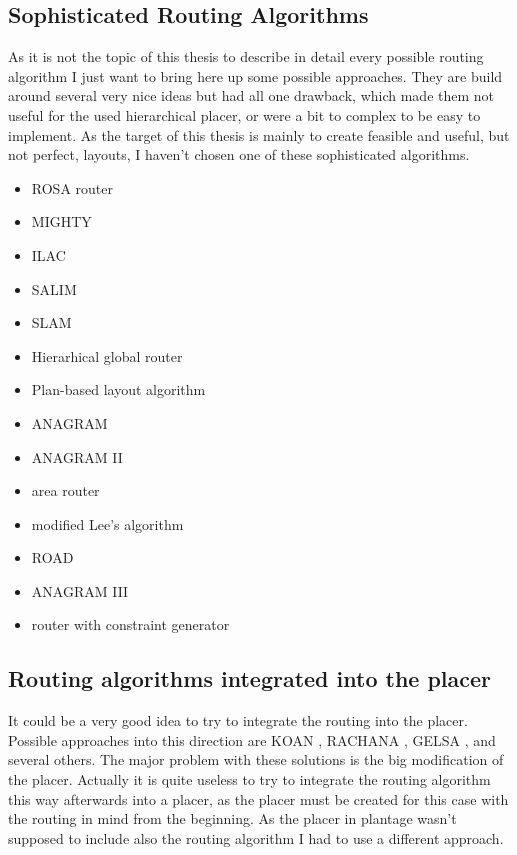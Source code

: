 \subsection{Sophisticated Routing Algorithms}
As it is not the topic of this thesis to describe in detail every possible routing algorithm I just want to bring here up some possible approaches. They are build around several very nice ideas but had all one drawback, which made them not useful for the used hierarchical placer, or were a bit to complex to be easy to implement. As the target of this thesis is mainly to create feasible and useful, but not perfect, layouts, I haven't chosen one of these sophisticated algorithms.
\begin{itemize}
\item ROSA router \cite[page 165]{springer:eda_analog_routing}
\item MIGHTY \cite[page 166]{springer:eda_analog_routing}
\item ILAC \cite[page 167]{springer:eda_analog_routing}
\item SALIM \cite[page 167]{springer:eda_analog_routing}
\item SLAM \cite[page 167]{springer:eda_analog_routing}
\item Hierarhical global router \cite[page 168]{springer:eda_analog_routing}
\item Plan-based layout algorithm \cite[page 168]{springer:eda_analog_routing}
\item ANAGRAM \cite[page 168]{springer:eda_analog_routing}
\item ANAGRAM II \cite[page 168]{springer:eda_analog_routing}
\item area router \cite[page 168]{springer:eda_analog_routing}
\item modified Lee's algorithm \cite[page 170]{springer:eda_analog_routing}
\item ROAD \cite[page 170]{springer:eda_analog_routing}
\item ANAGRAM III \cite[page 170]{springer:eda_analog_routing}
\item router with constraint generator \cite[page 172]{springer:eda_analog_routing}
\end{itemize}

\subsection{Routing algorithms integrated into the placer}
It could be a very good idea to try to integrate the routing into the placer. Possible approaches into this direction are KOAN \cite[page 178]{springer:eda_analog_routing}, RACHANA \cite[page 178]{springer:eda_analog_routing}, GELSA \cite[page 179]{springer:eda_analog_routing}, and several others. The major problem with these solutions is the big modification of the placer. Actually it is quite useless to try to integrate the routing algorithm this way afterwards into a placer, as the placer must be created for this case with the routing in mind from the beginning. As the placer in plantage wasn't supposed to include also the routing algorithm I had to use a different approach.

